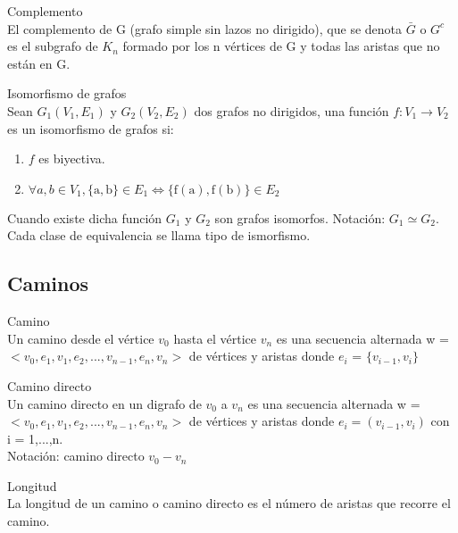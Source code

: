 \documentclass{article}
\begin{document}
\begin{defn}
Complemento \\ El complemento de G (grafo simple sin lazos no dirigido), que se denota $\bar{G}$ o $G^{c}$ es el subgrafo de $K_{n}$ formado por los n vértices de G y todas las aristas que no están en $\mathrm{G}$.
\end{defn}

\begin{defn}
Isomorfismo de grafos \\ Sean $G_{1}\left(V_{1}, E_{1}\right)$ y $G_{2}\left(V_{2}, E_{2}\right)$ dos grafos no dirigidos, una función $f: V_{1} \rightarrow V_{2}$ es un isomorfismo de grafos si:
\begin{enumerate}
    \item $f$ es biyectiva.
    \item $\forall a, b \in V_{1},\{\mathrm{a}, \mathrm{b}\} \in E_{1} \Leftrightarrow\{\mathrm{f}(\mathrm{a}), \mathrm{f}(\mathrm{b})\} \in E_{2}$
\end{enumerate}
Cuando existe dicha función $G_{1}$ y $G_{2}$ son grafos isomorfos. Notación: $G_{1} \simeq G_{2} .$ Cada clase de equivalencia se llama tipo de ismorfismo.
\end{defn}

\subsection{Caminos}

\begin{defn}
Camino \\ Un camino desde el vértice $v_{0}$ hasta el vértice $v_{n}$ es una secuencia alternada w = $< v_{0}, e_{1}, v_{1}, e_{2},..., v_{n-1}, e_{n}, v_{n} >$ de vértices y aristas donde $e_{i}$ = $\{v_{i-1}, v_{i}\}$
\end{defn}

\begin{defn}
Camino directo \\ Un camino directo en un digrafo de $v_{0}$ a $v_{n}$ es una secuencia alternada w = $< v_{0}, e_{1}, v_{1}, e_{2},..., v_{n-1}, e_{n}, v_{n} >$ de vértices y aristas donde $e_{i} = (v_{i-1}, v_{i})$ con i = 1,...,n.\\
Notación: camino directo $v_{0}-v_{n}$
\end{defn}

\begin{defn}
Longitud \\ La longitud de un camino o camino directo es el número de aristas que recorre el camino.
\end{defn}
\end{document}
